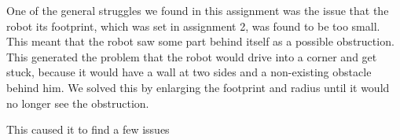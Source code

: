 


One of the general struggles we found in this assignment was the issue that the robot its footprint, which was set in assignment 2, was found to be too small. This meant that the robot saw some part behind itself as a possible obstruction. This generated the problem that the robot would drive into a corner and get stuck, because it would have a wall at two sides and a non-existing obstacle behind him. We solved this by enlarging the footprint and radius until it would no longer see the obstruction.

This caused it to find a few issues
